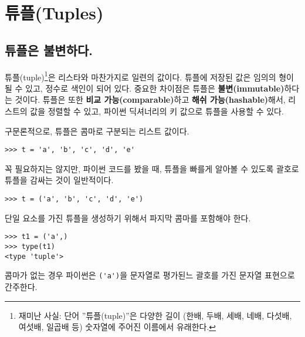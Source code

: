 
\chapter{튜플(Tuples)}
\label{tuplechap}

\section{튜플은 불변하다.}


튜플(tuple)\footnote{재미난 사실: 단어 ''튜플(tuple)''은 다양한 길이 (한배, 두배, 세배, 네배, 다섯배, 여섯배, 일곱배 등) 숫자열에 
주어진 이름에서 유래한다.}은 리스타와 마찬가지로 일련의 값이다. 튜플에 저장된 값은 임의의 형이 될 수 있고, 정수로 색인이 되어 있다.
중요한 차이점은 튜플은 {\bf 불변(immutable)}하다는 것이다.
튜플은 또한 {\bf 비교 가능(comparable)}하고 {\bf 해쉬 가능(hashable)}해서, 리스트의 값을 정렬할 수 있고, 파이썬 딕셔너리의 키 값으로 튜플을 사용할 수 있다.


구문론적으로, 튜플은 콤마로 구분되는 리스트 값이다.

\beforeverb
\begin{verbatim}
>>> t = 'a', 'b', 'c', 'd', 'e'
\end{verbatim}
\afterverb
%

꼭 필요하지는 않지만, 파이썬 코드를 봤을 때, 튜플을 빠를게 알아볼 수 있도록 괄호로 튜플을 감싸는 것이 일반적이다.


\beforeverb
\begin{verbatim}
>>> t = ('a', 'b', 'c', 'd', 'e')
\end{verbatim}
\afterverb
%

단일 요소를 가진 튜플을 생성하기 위해서 파지막 콤마를 포함해야 한다.


\beforeverb
\begin{verbatim}
>>> t1 = ('a',)
>>> type(t1)
<type 'tuple'>
\end{verbatim}
\afterverb
%

콤마가 없는 경우 파이썬은 \verb"('a')"을 문자열로 평가된느 괄호를 가진 문자열 표현으로 간주한다.

